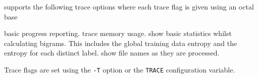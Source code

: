 
 supports the following trace options where each
trace flag is given using an octal base
\begin{optlist}
    basic progress reporting.
    trace memory usage.
    show basic statistics whilst calculating bigrams.
                  This includes the global training data entropy
                  and the entropy for each distinct label. 
    show file names as they are processed.
\end{optlist}
Trace flags are set using the \texttt{-T} option or the  \texttt{TRACE} 
configuration variable.


